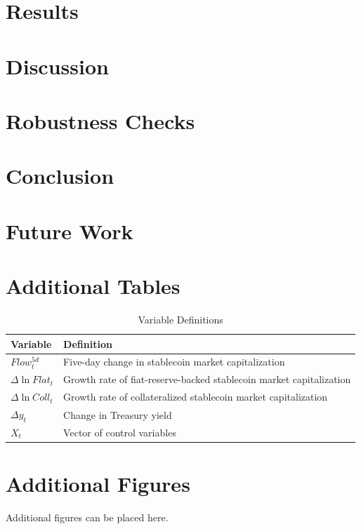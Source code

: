 \documentclass[12pt]{article}
\begin{document}
\section{Results}
\section{Discussion}
\section{Robustness Checks}
\section{Conclusion}
\section{Future Work}



























\newpage




\newpage

\appendix

\section{Additional Tables}

\begin{table}[H]
\centering
\caption{Variable Definitions}
\label{tab:variables}
\begin{tabular}{ll}
\toprule
Variable & Definition \\
\midrule
$Flow_t^{5d}$ & Five-day change in stablecoin market capitalization \\
$\Delta \ln Flat_t$ & Growth rate of fiat-reserve-backed stablecoin market capitalization \\
$\Delta \ln Coll_t$ & Growth rate of collateralized stablecoin market capitalization \\
$\Delta y_t$ & Change in Treasury yield \\
$X_t$ & Vector of control variables \\
\bottomrule
\end{tabular}
\end{table}

\section{Additional Figures}

Additional figures can be placed here.
\end{document}
